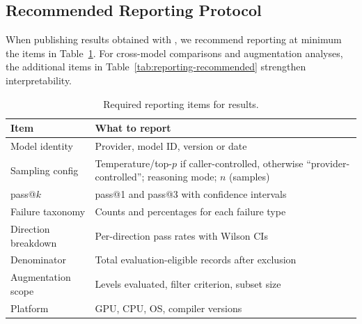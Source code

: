 \subsection{Recommended Reporting Protocol}
\label{sec:ec-reporting}

When publishing results obtained with \parbench{}, we recommend reporting at
minimum the items in Table~\ref{tab:reporting-required}. For cross-model
comparisons and augmentation analyses, the additional items in
Table~\ref{tab:reporting-recommended} strengthen interpretability.

\begin{table}[htbp]
\centering
\caption{Required reporting items for \parbench{} results.}
\label{tab:reporting-required}
\small
\begin{tabularx}{\columnwidth}{@{}p{2.3cm}X@{}}
\toprule
Item & What to report \\
\midrule
Model identity & Provider, model ID, version or date \\
Sampling config & Temperature/top-$p$ if caller-controlled, otherwise ``provider-controlled''; reasoning mode; $n$ (samples) \\
pass@$k$ & pass@1 and pass@3 with confidence intervals \\
Failure taxonomy & Counts and percentages for each failure type \\
Direction breakdown & Per-direction pass rates with Wilson CIs \\
Denominator & Total evaluation-eligible records after \knownfail{} exclusion \\
Augmentation scope & Levels evaluated, filter criterion, subset size \\
Platform & GPU, CPU, OS, compiler versions \\
\bottomrule
\end{tabularx}
\end{table}



